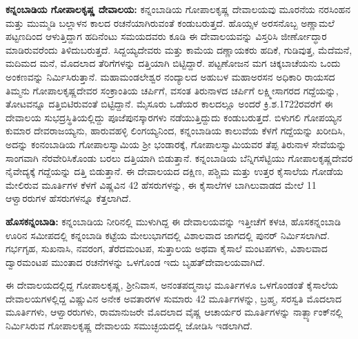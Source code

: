 \textbf{ಕನ್ನಂಬಾಡಿಯ ಗೋಪಾಲಕೃಷ್ಣ ದೇವಾಲಯ: } ಕನ್ನಂಬಾಡಿಯ ಗೋಪಾಲಕೃಷ್ಣ ದೇವಾಲಯವು ಮೂರನೆಯ ನರಸಿಂಹನ ಮತ್ತು ಮುಮ್ಮಡಿ ಬಲ್ಲಾಳನ ಕಾಲದ ರಚನೆಯಾಗಿರುವಂತೆ ಕಂಡುಬರುತ್ತದೆ. ಹೊಯ್ಸಳ ಅರಸನೊಬ್ಬ ಅಣ್ಣಾಮಲೆ ಪಟ್ಟಣದಿಂದ ಆಳುತ್ತಿದ್ದಾಗ ಹದಿನೆಂಟು ಸಮಯದವರು ಕೂಡಿ ಈ ದೇವಾಲಯವನ್ನು ವಿಸ್ತರಿಸಿ ಜೀರ್ಣೋದ್ಧಾರ ಮಾಡಿರುವರೆಂದು ತಿಳಿದುಬರುತ್ತದೆ. ಸಿದ್ದಯ್ಯದೇವರು ಮತ್ತು ಕಾಮೆಯ ದಣ್ಣಾಯಕರು ಹದಿಕೆ, ಗುಡಿವುತ್ತ, ಮೆದೆಮನೆ, ಮದಿಮದ ಮನೆ, ಮೊದಲಾದ ತೆರಿಗೆಗಳನ್ನು ದತ್ತಿಯಾಗಿ ಬಿಟ್ಟಿದ್ದಾರೆ. ಪಟ್ಟಣೋಜನ ಮಗ ಚಿಕ್ಕಬಾಚೆಯನು ಒಂದು ಅಂಕಣವನ್ನು ನಿರ್ಮಿಸಿರುತ್ತಾನೆ. ಮಹಾಮಂಡಲೇಶ್ವರ ನಂದ್ಯಾಲದ ಅಹುಬಳ ಮಹಾಅರಸನ ಅಧಿಕಾರಿ ರಾಯಸದ ತಿಮ್ಮನು ಗೋಪಾಲಕೃಷ್ಣದೇವರ ಸಂಕ್ರಾಂತಿಯ ಚರ್ಪಿಗೆ, ವಸಂತ ತಿರುನಾಳದ ಚರ್ಪಿಗೆ ಲಕ್ಷ್ಮೀಸಾಗರದ ಗದ್ದೆಯನ್ನು, ತೋಟವನ್ನೂ ದತ್ತಿಬಿಟಿರುವಂತೆ ಬಿಟ್ಟಿದ್ದಾನೆ. ಮೈಸೂರು ಒಡೆಯರ ಕಾಲದಲ್ಲೂ ಅಂದರೆ ಕ್ರಿ.ಶ.1722ರವರೆಗೆ ಈ ದೇವಾಲಯ ಸುಭದ್ರಸ್ಥಿತಿಯಲ್ಲಿದ್ದು ಪೂಜೆಪುನಸ್ಕಾರಗಳು ನಡೆಯುತ್ತಿದ್ದುದು ಕಂಡುಬರುತ್ತದೆ. ಬಿಳುಗಲಿ ಗೋಪಯ್ಯನ ಕುಮಾರ ದೇವರಾಜಯ್ಯನು, ಹಾರುವಹಳ್ಳಿ ಲಿಂಗಯ್ಯನಿಂದ, ಕನ್ನಂಬಾಡಿಯ ಕಾಲುವೆಯ ಕೆಳಗೆ ಗದ್ದೆಯನ್ನು ಖರೀದಿಸಿ, ಅದನ್ನು ಕಂನಂಬಾಡಿಯ ಗೋಪಾಲಸ್ವಾಮಿಯ ಶ‍್ರೀ ಭಂಡಾರಕ್ಕೆ, ಗೋಪಾಲಸ್ವಾಮಿಯವರ ತೆಪ್ಪ ತಿರುನಾಳ ಸೇವೆಯನ್ನು ಸಾಂಗವಾಗಿ ನೆರವೇರಿಸಿಕೊಂಡು ಬರಲು ದತ್ತಿಯಾಗಿ ಬಿಡುತ್ತಾನೆ. ಕನ್ನಂಬಾಡಿಯ ಬೆನ್ನಿಗಸೆಟ್ಟಿಯು ಗೋಪಾಲಕೃಷ್ಣದೇವರ ನೈವೇದ್ಯಕ್ಕೆ ಗದ್ದೆಯನ್ನು ದತ್ತಿ ಬಿಡುತ್ತಾನೆ. ಈ ದೇವಾಲಯದ ದಕ್ಷಿಣ, ಪಶ್ಚಿಮ ಮತ್ತು ಉತ್ತರ ಕೈಸಾಲೆಯ ಗೋಡೆಯ ಮೇಲಿರುವ ಮೂರ್ತಿಗಳ ಕೆಳಗೆ ವಿಷ್ಣವಿನ 42 ಹೆಸರುಗಳನ್ನು, ಈ ಕೈಸಾಲೆಗಳ ಬಾಗಿಲುವಾಡದ ಮೇಲೆ 11 ಆಳ್ವಾರರುಗಳ ಹೆಸರುಗಳನ್ನೂ ಕೆತ್ತಲಾಗಿದೆ.

\textbf{ಹೊಸಕನ್ನಂಬಾಡಿ:} ಕನ್ನಂಬಾಡಿಯ ನೀರಿನಲ್ಲಿ ಮುಳುಗಿದ್ದ ಈ ದೇವಾಲಯವನ್ನು ಇತ್ತೀಚೆಗೆ ಕಳಚಿ, ಹೊಸಕನ್ನಂಬಾಡಿ ಊರಿನ ಸಮೀಪದಲ್ಲಿ ಕನ್ನಂಬಾಡಿ ಕಟ್ಟೆಯ ಮೇಲುಭಾಗದಲ್ಲಿ ವಿಶಾಲವಾದ ಜಾಗದಲ್ಲಿ ಪುನರ್​ ನಿರ್ಮಿಸಲಾಗಿದೆ. ಗರ್ಭಗೃಹ, ಸುಖನಾಸಿ, ನವರಂಗ, ತೆರೆದಮಂಟಪ, ಸುತ್ತಾಲಯ ಅಥವಾ ಕೈಸಾಲೆ ಮಂಟಪಗಳು, ವಿಶಾಲವಾದ ದ್ವಾರಮಂಟಪ ಮುಂತಾದ ರಚನೆಗಳನ್ನು ಒಳಗೊಂಡ ಇದು ಬೃಹತ್​ ದೇವಾಲಯವಾಗಿದೆ. 

ಈ ದೇವಾಲಯದಲ್ಲಿದ್ದ ಗೋಪಾಲಕೃಷ್ಣ, ಶ‍್ರೀನಿವಾಸ, ಅನಂತಪದ್ಮನಾಭ ಮೂರ್ತಿಗಳೂ ಒಳಗೊಂಡಂತೆ ಕೈಸಾಲೆಯ ದೇವಾಲಯಗಳಲ್ಲಿದ್ದ ವಿಷ್ಣುವಿನ ಅನೇಕ ಅವತಾರಗಳ ಸುಮಾರು 42 ಮೂರ್ತಿಗಳನ್ನು, ಬ್ರಹ್ಮ, ಸರಸ್ವತಿ ಮೊದಲಾದ ಮೂರ್ತಿಗಳು, ಆಳ್ವಾರರುಗಳು, ರಾಮಾನುಜರೇ ಮೊದಲಾದ ವೈಷ್ಣ ಆಚಾರ್ಯರ ಮೂರ್ತಿಗಳನ್ನು ನಾರ್ತ್ಬ್ಯಾಂಕ್​ನಲ್ಲಿ ನಿರ್ಮಿಸಿರುವ ಗೋಪಾಲಕೃಷ್ಣ ದೇವಾಲಯ ಸಮುಚ್ಛಯದಲ್ಲಿ ಜೋಡಿಸಿ ಇಡಲಾಗಿದೆ.

